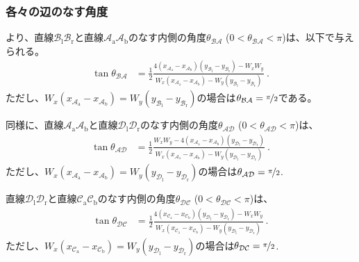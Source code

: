 \clearpage
\subsubsection{各々の辺のなす角度}
より、直線$\mathcal B_\mathrm l\mathcal B_\mathrm r$と直線$\mathcal A_\mathrm a\mathcal A_\mathrm b$のなす内側の角度$\theta_{\mathcal{BA}}$ ($0 < \theta_{\mathcal{BA}} < \pi$)は、以下で与えられる。
\begin{align*}
  \tan\theta_{\mathcal{BA}}
  &= \frac12
     \frac{4\left(x_{\mathcal A_\mathrm a}-x_{\mathcal A_\mathrm b}\right)
            \left(y_{\mathcal B_\mathrm l}-y_{\mathcal B_\mathrm r}\right)
           -W_xW_y}
          {W_x\left(x_{\mathcal A_\mathrm a}-x_{\mathcal A_\mathrm b}\right)
           -W_y\left(y_{\mathcal B_\mathrm l}-y_{\mathcal B_\mathrm r}\right)}\ .
\end{align*}
ただし、$W_x\left(x_{\mathcal A_\mathrm a}-x_{\mathcal A_\mathrm b}\right) = W_y\left(y_{\mathcal B_\mathrm l}-y_{\mathcal B_\mathrm r}\right)$の場合は$\theta_{\mathcal{BA}} = \nicefrac\pi2$である。

同様に、直線$\mathcal A_\mathrm a\mathcal A_\mathrm b$と直線$\mathcal D_\mathrm l\mathcal D_\mathrm r$のなす内側の角度$\theta_{\mathcal{AD}}$ ($0 < \theta_{\mathcal{AD}} < \pi$)は、
\begin{align*}
  \tan\theta_{\mathcal{AD}}
  &= \frac12
     \frac{W_xW_y
           -4\left(x_{\mathcal A_\mathrm a}-x_{\mathcal A_\mathrm b}\right)
             \left(y_{\mathcal D_\mathrm l}-y_{\mathcal D_\mathrm r}\right)}
          {W_x\left(x_{\mathcal A_\mathrm a}-x_{\mathcal A_\mathrm b}\right)
           -W_y\left(y_{\mathcal D_\mathrm l}-y_{\mathcal D_\mathrm r}\right)}\ .
\end{align*}
ただし、$W_x\left(x_{\mathcal A_\mathrm a}-x_{\mathcal A_\mathrm b}\right) = W_y\left(y_{\mathcal D_\mathrm l}-y_{\mathcal D_\mathrm r}\right)$の場合は$\theta_{\mathcal{AD}} = \nicefrac\pi2$.

直線$\mathcal D_\mathrm l\mathcal D_\mathrm r$と直線$\mathcal C_\mathrm a\mathcal C_\mathrm b$のなす内側の角度$\theta_{\mathcal{DC}}$ ($0 < \theta_{\mathcal{DC}} < \pi$)は、
\begin{align*}
  \tan\theta_{\mathcal{DC}}
  &= \frac12
     \frac{4\left(x_{\mathcal C_\mathrm a}-x_{\mathcal C_\mathrm b}\right)
            \left(y_{\mathcal D_\mathrm l}-y_{\mathcal D_\mathrm r}\right)
           -W_xW_y}
          {W_x\left(x_{\mathcal C_\mathrm a}-x_{\mathcal C_\mathrm b}\right)
           -W_y\left(y_{\mathcal D_\mathrm l}-y_{\mathcal D_\mathrm r}\right)}\ .
\end{align*}
ただし、$W_x\left(x_{\mathcal C_\mathrm a}-x_{\mathcal C_\mathrm b}\right) = W_y\left(y_{\mathcal D_\mathrm l}-y_{\mathcal D_\mathrm r}\right)$の場合は$\theta_{\mathcal{DC}} = \nicefrac\pi2$.

